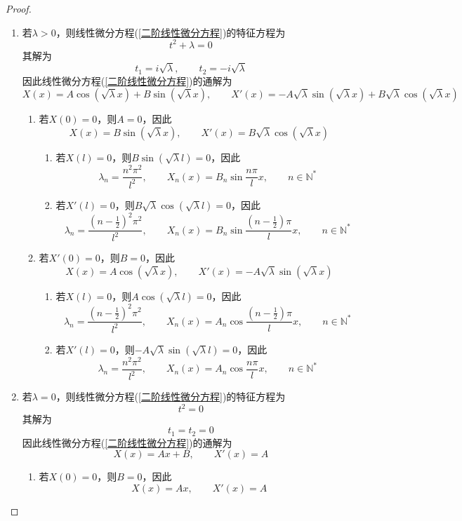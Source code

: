 \documentclass[lang = cn, scheme = chinese, thmcnt = section]{elegantbook}
\newcommand{\N}{\mathbb{N}}            %
\begin{document}
\begin{proof}
	\begin{enumerate}
		\item 若$\lambda>0$，则线性微分方程(\ref{二阶线性微分方程})的特征方程为%
		$$
		t^2+\lambda=0
		$$
		其解为%
		$$
		t_1=i\sqrt{\lambda},\qquad
		t_2=-i\sqrt{\lambda}
		$$
		因此线性微分方程(\ref{二阶线性微分方程})的通解为%
		$$
		X(x)=A\cos(\sqrt{\lambda}x)+B\sin(\sqrt{\lambda}x),\qquad
		X'(x)=-A\sqrt{\lambda}\sin(\sqrt{\lambda}x)+B\sqrt{\lambda}\cos(\sqrt{\lambda}x)
		$$
		\begin{enumerate}
			\item 若$X(0)=0$，则$A=0$，因此%
			$$
			X(x)=B\sin(\sqrt{\lambda}x),\qquad
			X'(x)=B\sqrt{\lambda}\cos(\sqrt{\lambda}x)
			$$
			\begin{enumerate}
				\item 若$X(l)=0$，则$B\sin(\sqrt{\lambda}l)=0$，因此
				$$
				\lambda_n=\frac{n^2\pi^2}{l^2},\qquad 
				X_n(x)=B_n\sin\frac{n\pi}{l}x,\qquad n\in\N^*
				$$
				\item 若$X'(l)=0$，则$B\sqrt{\lambda}\cos(\sqrt{\lambda}l)=0$，因此
				$$
				\lambda_n=\frac{\left(n-\frac{1}{2}\right)^2\pi^2}{l^2},\qquad 
				X_n(x)=B_n\sin\frac{\left(n-\frac{1}{2}\right)\pi}{l}x,\qquad n\in\N^*
				$$
			\end{enumerate}
			\item 若$X'(0)=0$，则$B=0$，因此%
			$$
			X(x)=A\cos(\sqrt{\lambda}x),\qquad
			X'(x)=-A\sqrt{\lambda}\sin(\sqrt{\lambda}x)
			$$
			\begin{enumerate}
				\item 若$X(l)=0$，则$A\cos(\sqrt{\lambda}l)=0$，因此
				$$
				\lambda_n=\frac{\left(n-\frac{1}{2}\right)^2\pi^2}{l^2},\qquad 
				X_n(x)=A_n\cos\frac{\left(n-\frac{1}{2}\right)\pi}{l}x,\qquad n\in\N^*
				$$
				\item 若$X'(l)=0$，则$-A\sqrt{\lambda}\sin(\sqrt{\lambda}l)=0$，因此
				$$
				\lambda_n=\frac{n^2\pi^2}{l^2},\qquad 
				X_n(x)=A_n\cos\frac{n\pi}{l}x,\qquad n\in\N^*
				$$
			\end{enumerate}
		\end{enumerate}
		\item 若$\lambda=0$，则线性微分方程(\ref{二阶线性微分方程})的特征方程为%
		$$
		t^2=0
		$$
		其解为%
		$$
		t_1=t_2=0
		$$
		因此线性微分方程(\ref{二阶线性微分方程})的通解为%
		$$
		X(x)=Ax+B,\qquad
		X'(x)=A
		$$
		\begin{enumerate}
			\item 若$X(0)=0$，则$B=0$，因此
			$$
			X(x)=Ax,\qquad
			X'(x)=A
$$
\end{enumerate}
\end{enumerate}
\end{proof}
\end{document}
